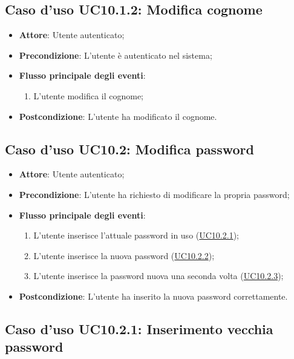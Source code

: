 \documentclass[12pt,a4paper]{article}
\begin{document}
\subsection{Caso d'uso UC10.1.2: Modifica cognome}

\begin{itemize}

\item \textbf{Attore}: Utente autenticato; 
\item \textbf{Precondizione}: L'utente è autenticato nel sistema;

\item \textbf{Flusso principale degli eventi}:
\begin{enumerate}
	\item L'utente modifica il cognome;
	
\end{enumerate}
\item \textbf{Postcondizione}: L'utente ha modificato il cognome.
\end{itemize}
\hypertarget{UC10.2}{}
\subsection{Caso d'uso UC10.2: Modifica password}

\begin{itemize}
\item \textbf{Attore}: Utente autenticato; 
\item \textbf{Precondizione}: L’utente ha richiesto di modificare la propria password;

\item \textbf{Flusso principale degli eventi}:
\begin{enumerate}
	\item L’utente inserisce l’attuale password in uso (\hyperlink{UC10.2.1}{UC10.2.1});
	\item L’utente inserisce la nuova password (\hyperlink{UC10.2.2}{UC10.2.2});
	\item L’utente inserisce la password nuova una seconda volta (\hyperlink{UC10.2.3}{UC10.2.3});
	
\end{enumerate}
\item \textbf{Postcondizione}: L'utente ha inserito la nuova password correttamente.
\end{itemize}
\hypertarget{UC10.2.1}{}
\subsection{Caso d'uso UC10.2.1:  Inserimento vecchia password}
\end{document}
